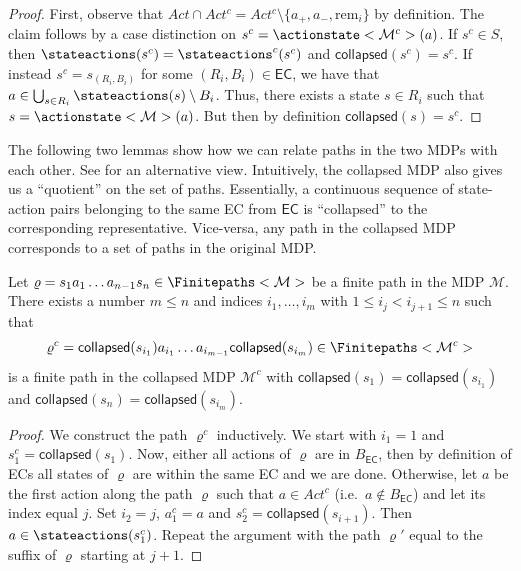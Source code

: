 \documentclass{article}
\newcommand{\intersectionSym}{\cap}
\newcommand{\intersectionBin}{\mathbin{\intersectionSym}}
\newcommand{\UnionSym}{\bigcup}
\newcommand{\intersection}{\intersectionBin}
\newcommand{\Union}{\UnionSym}
\newcommand{\MDP}{\mathcal{M}}
\newcommand{\States}{S}
\newcommand{\Actions}{Act}
\newcommand{\finitepath}{\varrho}
\newcommand{\ecremain}{\mathrm{rem}}
\newcommand{\eccollapsed}{\mathsf{collapsed}}
\newcommand{\algoecs}{\mathsf{EC}}
\begin{document}
\begin{proof}
	First, observe that $\Actions \intersection \Actions^c = \Actions^c \setminus \{a_+, a_-, \ecremain_i\}$ by definition.
	The claim follows by a case distinction on $s^c = \actionstate<\MDP^c>(a)$.
	If $s^c \in \States$, then $\stateactions(s^c) = \stateactions^c(s^c)$ and $\eccollapsed(s^c) = s^c$.
	If instead $s^c = s_{(R_i, B_i)}$ for some $(R_i, B_i) \in \algoecs$, we have that $a \in \Union_{s \in R_i} \stateactions(s) \setminus B_i$.
	Thus, there exists a state $s \in R_i$ such that $s = \actionstate<\MDP>(a)$.
	But then by definition $\eccollapsed(s) = s^c$. 
\end{proof}
The following two lemmas show how we can relate paths in the two MDPs with each other.
See \cite[Section~6.4.1]{de1997formal} for an alternative view.
Intuitively, the collapsed MDP also gives us a \enquote{quotient} on the set of paths.
Essentially, a continuous sequence of state-action pairs belonging to the same EC from $\algoecs$ is \enquote{collapsed} to the corresponding representative.
Vice-versa, any path in the collapsed MDP corresponds to a set of paths in the original MDP.
\begin{lemma} \label{stm:collapse:path_normal_to_collapsed}
	Let $\finitepath = s_1 a_1 \dots a_{n-1} s_n \in \Finitepaths<\MDP>$ be a finite path in the MDP $\MDP$.
	There exists a number $m \leq n$ and indices $i_1, \dots, i_m$ with $1 \leq i_j < i_{j+1} \leq n$ such that
    \begin{equation*}
        \finitepath^c = \eccollapsed(s_{i_1}) a_{i_1} \dots a_{i_{m-1}} \eccollapsed(s_{i_m}) \in \Finitepaths<\MDP^c>    
    \end{equation*}
    is a finite path in the collapsed MDP $\MDP^c$ with $\eccollapsed(s_1) = \eccollapsed(s_{i_1})$ and $\eccollapsed(s_n) = \eccollapsed(s_{i_m})$.
\end{lemma}
\begin{proof}
	We construct the path $\finitepath^c$ inductively.
	We start with $i_1 = 1$ and $s_1^c = \eccollapsed(s_1)$.
	Now, either all actions of $\finitepath$ are in $B_\algoecs$, then by definition of ECs all states of $\finitepath$ are within the same EC and we are done.
	Otherwise, let $a$ be the first action along the path $\finitepath$ such that $a \in \Actions^c$ (i.e.\ $a \notin B_\algoecs$) and let its index equal $j$.
	Set $i_2 = j$, $a_1^c = a$ and $s_2^c = \eccollapsed(s_{i+1})$.
	Then $a \in \stateactions(s_1^c)$.
	Repeat the argument with the path $\finitepath'$ equal to the suffix of $\finitepath$ starting at $j + 1$. 
\end{proof}
\end{document}
